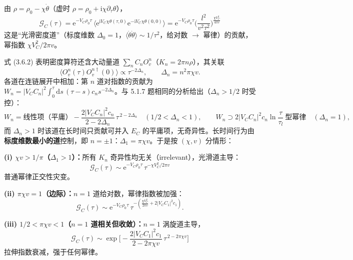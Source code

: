 由 $\rho=\rho_0-\chi\dot\theta$（虚时 $\rho=\rho_0+\mathrm{i}\chi\partial_\tau\theta$），
\begin{equation*}
\mathcal{G}_C(\tau)=\mathrm{e}^{-V_C\rho_0\tau}\,
\big\langle\mathrm{e}^{\mathrm{i}V_C\chi\theta(\tau,0)}\mathrm{e}^{-\mathrm{i}V_C\chi\theta(0,0)}\big\rangle
=\mathrm{e}^{-V_C\rho_0\tau}\Big(\frac{l^{2}}{v^{2}\tau^{2}}\Big)^{\frac{\chi V_C^{2}}{4\pi v}}
\end{equation*}
这是“光滑密度道”（标度维数 $\Delta_0=1$，$\langle\dot\theta\dot\theta\rangle\sim1/\tau^{2}$，给对数 $\to$ 幂律）的贡献，幂指数 $\chi V_C^{2}/2\pi v$。

式 (3.6.2) 表明密度算符还含大动量道 $\sum_nC_nO_v^{n}$（$K_n=2\pi n\rho$），其关联
\begin{equation*}
\langle O_v^{n}(\tau)O_v^{n\dagger}(0)\rangle\propto\tau^{-2\Delta_n},\qquad \Delta_n=n^{2}\pi\chi v .
\end{equation*}
各道在连链展开中相加：第 $n$ 道对指数的贡献为 $W_n=|V_CC_n|^{2}\int_0^{\tau}\mathrm{d}s\,(\tau-s)c_n s^{-2\Delta_n}$。与 5.1.7 题相同的分析给出（$\Delta_n>1/2$ 时受控）：
\begin{equation*}
W_n=\text{线性项（平庸）}
-\frac{2|V_CC_n|^{2}c_n}{2-2\Delta_n}\,\tau^{\,2-2\Delta_n}\quad(1/2<\Delta_n<1),
\qquad
W_n\supset 2|V_CC_n|^{2}c_n\ln\frac{\tau}{\tau_l}\ \text{型幂律}\quad(\Delta_n=1),
\end{equation*}
而 $\Delta_n>1$ 时该道在长时间只贡献可并入 $E_C$ 的平庸项，无奇异性。长时间行为由\textbf{标度维数最小的道}控制，即 $n=\pm1$：$\Delta_1=\pi\chi v$。于是按 $(\chi,v)$ 分情形：

\textbf{(i) $\chi v>1/\pi$（$\Delta_1>1$）：}所有 $K_n$ 奇异性均无关（irrelevant），光滑道主导：
\begin{equation*}
\boxed{\;\mathcal{G}_C(\tau)\sim\mathrm{e}^{-V_C\rho_0\tau}\,\tau^{-\chi V_C^{2}/2\pi v}\;}
\end{equation*}
普通幂律正交性灾变。

\textbf{(ii) $\pi\chi v=1$（边际）：}$n=1$ 道给对数，幂律指数被加强：
\begin{equation*}
\mathcal{G}_C(\tau)\sim\mathrm{e}^{-V_C\rho_0\tau}\,\tau^{-\left(\frac{\chi V_C^{2}}{2\pi v}+2|V_CC_1|^{2}c_1\right)} .
\end{equation*}

\textbf{(iii) $1/2<\pi\chi v<1$（$n=1$ 道相关但收敛）：}$n=1$ 涡旋道主导，
\begin{equation*}
\boxed{\;\mathcal{G}_C(\tau)\sim\exp\!\Big[-\frac{2|V_CC_1|^{2}c_1}{2-2\pi\chi v}\,\tau^{\,2-2\pi\chi v}\Big]\;}
\end{equation*}
拉伸指数衰减，强于任何幂律。

